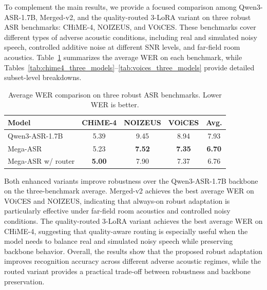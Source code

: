 \documentclass{article}
\begin{document}
To complement the main results, we provide a focused comparison among
Qwen3-ASR-1.7B, Merged-v2, and the quality-routed 3-LoRA variant on three robust
ASR benchmarks: CHiME-4, NOIZEUS, and VOiCES. These benchmarks cover different
types of adverse acoustic conditions, including real and simulated noisy speech,
controlled additive noise at different SNR levels, and far-field room acoustics.
Table~\ref{tab:robust_three_dataset_summary} summarizes the average WER on each
benchmark, while Tables~\ref{tab:chime4_three_models}--\ref{tab:voices_three_models}
provide detailed subset-level breakdowns.

\begin{table}[t]
\centering
\small
\caption{
Average WER comparison on three robust ASR benchmarks. Lower WER is better.
}
\vspace{-1mm}
\label{tab:robust_three_dataset_summary}
\begin{tabular}{lcccc}
\toprule
\textbf{Model}
& \textbf{CHiME-4}
& \textbf{NOIZEUS}
& \textbf{VOiCES}
& \textbf{Avg.} \\
\midrule
Qwen3-ASR-1.7B
& 5.39 & 9.45 & 8.94 & 7.93 \\

Mega-ASR
& 5.23 & \textbf{7.52} & \textbf{7.35} & \textbf{6.70} \\

Mega-ASR w/ router
& \textbf{5.00} & 7.90 & 7.37 & 6.76 \\
\bottomrule
\end{tabular}
\vspace{-2mm}
\end{table}

Both enhanced variants improve robustness over the Qwen3-ASR-1.7B backbone on
the three-benchmark average. Merged-v2 achieves the best average WER on VOiCES
and NOIZEUS, indicating that always-on robust adaptation is particularly
effective under far-field room acoustics and controlled noisy conditions.
The quality-routed 3-LoRA variant achieves the best average WER on CHiME-4,
suggesting that quality-aware routing is especially useful when the model needs
to balance real and simulated noisy speech while preserving backbone behavior.
Overall, the results show that the proposed robust adaptation improves
recognition accuracy across different adverse acoustic regimes, while the routed
variant provides a practical trade-off between robustness and backbone
preservation.
\end{document}
